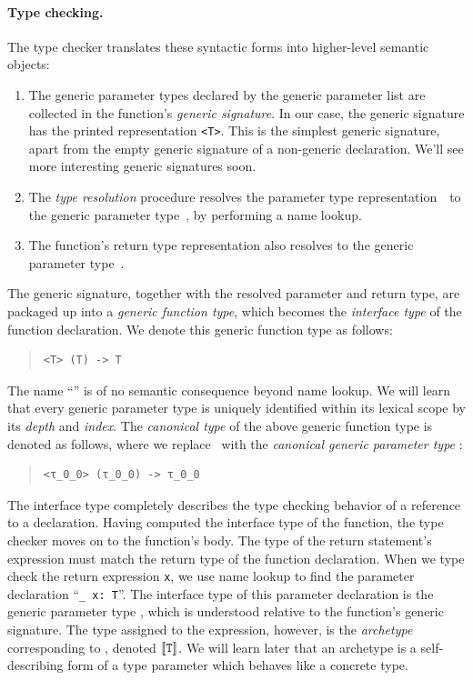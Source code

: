 \documentclass[../generics]{subfiles}
\begin{document}
\paragraph{Type checking.} The type checker translates these syntactic forms into higher-level semantic objects:
\begin{enumerate}
\item The generic parameter types declared by the generic parameter list are collected in the function's \emph{generic signature}. In our case, the generic signature has the printed representation \texttt{<T>}. This is the simplest generic signature, apart from the empty generic signature of a non-generic declaration. We'll see more interesting generic signatures soon.

\item The \emph{type resolution} procedure resolves the parameter type representation~\tT\ to the generic parameter type~\tT, by performing a name lookup.

\item The function's return type representation also resolves to the generic parameter type~\tT.
\end{enumerate}
The generic signature, together with the resolved parameter and return type, are packaged up into a \emph{generic function type}, which becomes the \emph{interface type} of the function declaration. We denote this generic function type as follows:
\begin{quote}
\begin{verbatim}
<T> (T) -> T
\end{verbatim}
\end{quote}
The name ``\tT'' is of no semantic consequence beyond name lookup. We will learn that every generic parameter type is uniquely identified within its lexical scope by its \emph{depth} and \emph{index}. The \emph{canonical type} of the above generic function type is denoted as follows, where we replace \tT\ with the \emph{canonical generic parameter type} :
\begin{quote}
\begin{verbatim}
<τ_0_0> (τ_0_0) -> τ_0_0
\end{verbatim}
\end{quote}

The interface type completely describes the type checking behavior of a reference to a declaration. Having computed the interface type of the function, the type checker moves on to the function's body. The type of the return statement's expression must match the return type of the function declaration. When we type check the return expression \texttt{x}, we use name lookup to find the parameter declaration ``\verb|_ x: T|''. The interface type of this parameter declaration is the generic parameter type \tT, which is understood relative to the function's generic signature. The type assigned to the expression, however, is the \emph{archetype} corresponding to \tT, denoted $[\![\texttt{T}]\!]$. We will learn later that an archetype is a self-describing form of a type parameter which behaves like a concrete type.
\end{document}
